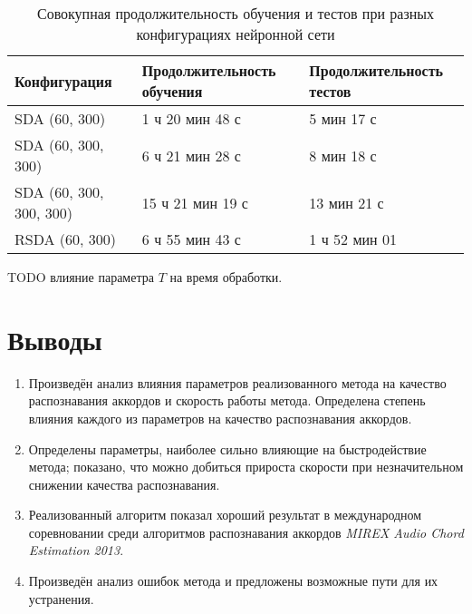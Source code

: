 \begin{table} [htbp]
  \centering
  \parbox{15cm}{\caption{Совокупная продолжительность обучения и тестов при
  разных конфигурациях нейронной сети}
  \label{TTimeConf}}
  \begin{tabular}{|l|l|l|}
  \hline
  Конфигурация & Продолжительность обучения & Продолжительность тестов \\
  \hline
  SDA (60, 300) & 1 ч 20 мин 48 с & 5 мин 17 с \\
  SDA (60, 300, 300) & 6 ч 21 мин 28 с & 8 мин 18 с \\
  SDA (60, 300, 300, 300) & 15 ч 21 мин 19 с & 13 мин 21 с \\
  RSDA (60, 300) & 6 ч 55 мин 43 с & 1 ч 52 мин 01 \\
  \hline
  \end{tabular}
\end{table}

TODO влияние параметра $T$ на время обработки.

\section{Выводы}

\begin{enumerate}
  \item Произведён анализ влияния параметров реализованного метода на качество
  распознавания аккордов и скорость работы метода. Определена степень влияния
  каждого из параметров на качество распознавания аккордов.
  \item Определены параметры, наиболее сильно влияющие на быстродействие метода;
  показано, что можно добиться прироста скорости при незначительном снижении
  качества распознавания.
  \item Реализованный алгоритм показал хороший результат в международном
  соревновании среди алгоритмов распознавания аккордов \emph{MIREX Audio Chord
  Estimation 2013}.
  \item Произведён анализ ошибок метода и предложены возможные пути для их
  устранения.
\end{enumerate}


\clearpage